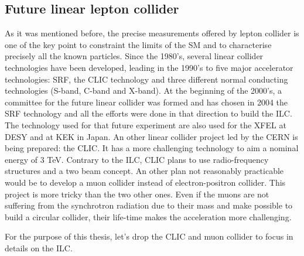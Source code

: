     \subsection{Future linear lepton collider}

    As it was mentioned before, the precise measurements offered by lepton collider is one of the key point to constraint the limits of the \gls{SM} and to characterise precisely all the known particles.
    Since the 1980's, several linear collider technologies have been developed, leading in the 1990's to five major accelerator technologies: \gls{SRF}, the \gls{CLIC} technology and three different normal conducting technologies (S-band, C-band and X-band).
    At the beginning of the 2000's, a committee for the future linear collider was formed and has chosen in 2004 the \gls{SRF} technology and all the efforts were done in that direction to build the \gls{ILC}.
    The technology used for that future experiment are also used for the XFEL at DESY and at KEK in Japan.
    An other linear collider project led by the CERN is being prepared: the \gls{CLIC}.
    It has a more challenging technology to aim a nominal energy of 3 TeV.
    Contrary to the \gls{ILC}, \gls{CLIC} plans to use radio-frequency structures and a two beam concept. 
    An other plan not reasonably practicable would be to develop a muon collider instead of electron-positron collider.
    This project is more tricky than the two other ones.
    Even if the muons are not suffering from the synchrotron radiation due to their mass and make possible to build a circular collider, their life-time makes the acceleration more challenging.

    For the purpose of this thesis, let's drop the \gls{CLIC} and muon collider to focus in details on the \gls{ILC}.
     

